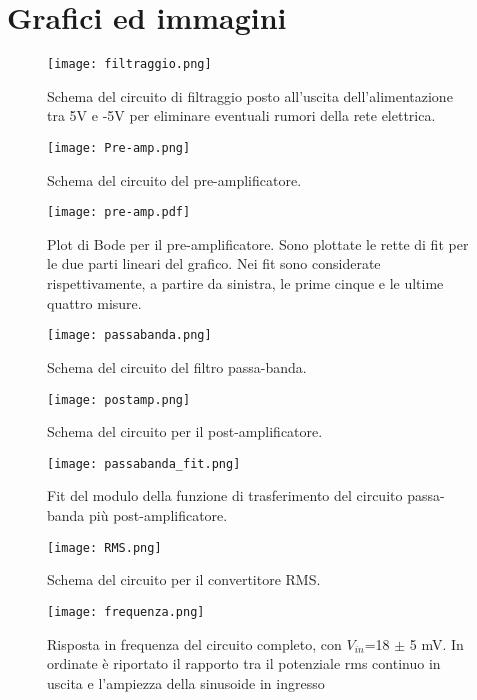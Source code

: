 \section{Grafici ed immagini}

\begin{figure}[h]
	\centering
	\texttt{[image: filtraggio.png]}
	\caption{Schema del circuito di filtraggio posto all'uscita dell'alimentazione tra 5V e -5V per eliminare eventuali rumori della rete elettrica.}
	\label{f:filtraggio}
\end{figure}

\begin{figure}[h]
	\centering
	\texttt{[image: Pre-amp.png]}
	\caption{Schema del circuito del pre-amplificatore.}
	\label{f:Pre-amp}
\end{figure}

\begin{figure}[h]
	\centering
	\texttt{[image: pre-amp.pdf]}
	\caption{Plot di Bode per il pre-amplificatore. Sono plottate le rette di fit per le due parti lineari del grafico. Nei fit sono considerate rispettivamente, a partire da sinistra, le prime cinque e le ultime quattro misure.}
	\label{f:pre-amp}
\end{figure}

\begin{figure}[h]
	\centering
	\texttt{[image: passabanda.png]}
	\caption{Schema del circuito del filtro passa-banda.}
	\label{f:passabanda}
\end{figure}

\begin{figure}[h]
	\centering
	\texttt{[image: postamp.png]}
	\caption{Schema del circuito per il post-amplificatore.}
	\label{f:post-amp}
\end{figure}

\begin{figure}[h]
	\centering
	\texttt{[image: passabanda\_fit.png]}
	\caption{Fit del modulo della funzione di trasferimento del circuito passa-banda più post-amplificatore.}
	\label{f:passabanda_fit}
\end{figure}

\begin{figure}[h]
	\centering
	\texttt{[image: RMS.png]}
	\caption{Schema del circuito per il convertitore RMS.}
	\label{f:Convertitore}
\end{figure}

\begin{figure}[h]
	\centering
	\texttt{[image: frequenza.png]}
	\caption{Risposta in frequenza del circuito completo, con $V_{in}$=18 $\pm$ 5 mV. In ordinate è riportato il rapporto tra il potenziale rms continuo in uscita e l'ampiezza della sinusoide in ingresso}
	\label{f:frequenza}
\end{figure}

